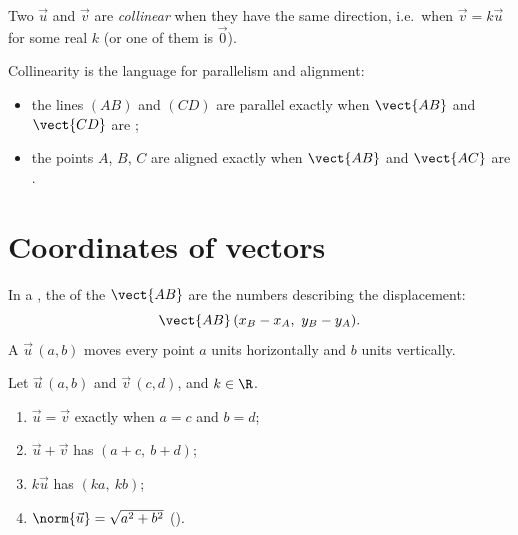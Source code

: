 \begin{definition}[Collinearity]\label{def:g10:vectors:collinear}
Two  $\vec u$ and $\vec v$ are
\emph{collinear} when they have the same
direction, i.e.\ when $\vec v = k \vec u$ for some real $k$ (or one of
them is $\vec 0$).
\end{definition}

\begin{remark}
Collinearity is the  language for parallelism and alignment:
\begin{itemize}
  \item the lines $(AB)$ and $(CD)$ are parallel exactly when $\vect{AB}$
        and $\vect{CD}$ are ;
  \item the points $A$, $B$, $C$ are aligned exactly when $\vect{AB}$ and
        $\vect{AC}$ are .
\end{itemize}
\end{remark}

\section{Coordinates of vectors}

\begin{definition}\label{def:g10:vectors:coords}
In a , the \emph{} of the  $\vect{AB}$
are the numbers describing the displacement:
\[
\vect{AB}\,(x_B - x_A,\ y_B - y_A).
\]
A  $\vec u\,(a, b)$ moves every point $a$ units horizontally and
$b$ units vertically.
\end{definition}

\begin{proposition}\label{prop:g10:vectors:coordrules}
Let $\vec u\,(a, b)$ and $\vec v\,(c, d)$, and $k \in \R$.
\begin{enumerate}
  \item $\vec u = \vec v$ exactly when $a = c$ and $b = d$;
  \item $\vec u + \vec v$ has  $(a + c,\ b + d)$;
  \item $k\vec u$ has  $(ka,\ kb)$;
  \item $\norm{\vec u} = \sqrt{a^2 + b^2}$ ().
\end{enumerate}
\end{proposition}

